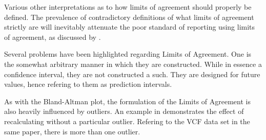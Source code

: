 \documentclass[12pt, a4paper]{report}
\theoremstyle{plain}
\theoremstyle{definition}
\theoremstyle{remark}
\begin{document}
Various other interpretations as to how limits of agreement should properly be defined. The prevalence of contradictory definitions of what limits of agreement strictly are will inevitably attenuate the poor standard of reporting using limits of agreement, as discussed by \citet{mantha}.









Several problems have been highlighted regarding Limits of
Agreement. One is the somewhat arbitrary manner in which they are
constructed. While in essence a confidence interval, they are not
constructed a such. They are designed for future values, hence \citet{BXC2008} refering to them as prediction intervals.

As with the Bland-Altman plot, the formulation of the Limits of Agreement is also heavily influenced by outliers. An example
in \citet*{BA83} demonstrates the effect of recalculating without
a particular outlier. Refering to the VCF data set in the same
paper, there is more than one outlier.





\end{document}
